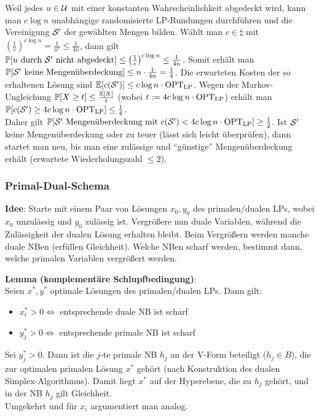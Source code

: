 Weil jedes $u \in \U$ mit einer konstanten Wahrscheinlichkeit abgedeckt wird,
kann man $c \log n$ unabhängige randomisierte
LP-Rundungen durchführen und die Vereinigung $\S'$ der gewählten Mengen bilden.
Wählt man $c \in \natural$ mit
$\left(\frac{1}{e}\right)^{c \log n} = \frac{1}{n^c} \le \frac{1}{4n}$, dann gilt\\
$\PP[\text{$u$ durch $\S'$ nicht abgedeckt}] \le
\left(\frac{1}{e}\right)^{c \log n} \le \frac{1}{4n}$.
Somit erhält man\\
$\PP[\text{$\S'$ keine Mengenüberdeckung}] \le
n \cdot \frac{1}{4n} = \frac{1}{4}$.
Die erwarteten Kosten der so erhaltenen Lösung sind
$\EE[c(\S')] \le c \log n \cdot \OPTLP$.
Wegen der Markov-Ungleichung $\PP[X \ge t] \le \frac{\EE[X]}{t}$
(wobei $t := 4c \log n \cdot \OPTLP$) erhält man
$\PP[c(\S') \ge 4c\log n \cdot \OPTLP] \le \frac{1}{4}$.\\
Daher gilt
$\PP[\text{$\S'$ Mengenüberdeckung mit $c(\S') < 4c \log n \cdot \OPTLP$}] \ge \frac{1}{2}$.
Ist $\S'$ keine Mengenüberdeckung oder zu teuer (lässt sich leicht überprüfen),
dann startet man neu, bis man eine zulässige und "`günstige"' Mengenüberdeckung erhält
(erwartete Wiederholungszahl $\le 2$).

\pagebreak

\subsubsection{%
    Primal-Dual-Schema%
}

\textbf{Idee}:
Starte mit einem Paar von Lösungen $x_0, y_0$ des primalen/dualen LPs,
wobei $x_0$ unzulässig und $y_0$ zulässig ist.
Vergrößere nun duale Variablen, während die Zulässigkeit der dualen Lösung erhalten bleibt.
Beim Vergrößern werden manche duale NBen  (erfüllen Gleichheit).
Welche NBen scharf werden, bestimmt dann, welche primalen Variablen vergrößert werden.

\textbf{Lemma (komplementäre Schlupfbedingung)}:\\
Seien $x^\ast, y^\ast$ optimale Lösungen des primalen/dualen LPs.
Dann gilt:
\begin{itemize}
    \item
    $x_i^\ast > 0 \iff$ entsprechende duale NB ist scharf

    \item
    $y_j^\ast > 0 \iff$ entsprechende primale NB ist scharf
\end{itemize}

\begin{Beweis}
    Sei $y_j^\ast > 0$.
    Dann ist die $j$-te primale NB $h_j$ an der V-Form beteiligt ($h_j \in B$),
    die zur optimalen primalen Lösung $x^\ast$ gehört
    (nach Konstruktion des dualen Simplex-Algorithmus).
    Damit liegt $x^\ast$ auf der Hyperebene, die zu $h_j$ gehört, und
    in der NB $h_j$ gilt Gleichheit.\\
    Umgekehrt und für $x_i$ argumentiert man analog.
\end{Beweis}

